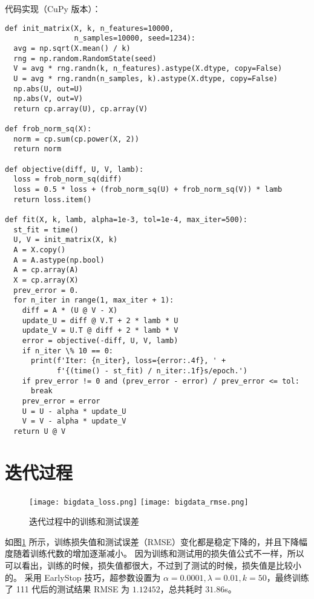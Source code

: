 \documentclass[degree=project,degree-type=project]{thuthesis}
\begin{document}
代码实现（CuPy 版本）：

  \begin{verbatim}
def init_matrix(X, k, n_features=10000,
                n_samples=10000, seed=1234):
  avg = np.sqrt(X.mean() / k)
  rng = np.random.RandomState(seed)
  V = avg * rng.randn(k, n_features).astype(X.dtype, copy=False)
  U = avg * rng.randn(n_samples, k).astype(X.dtype, copy=False)
  np.abs(U, out=U)
  np.abs(V, out=V)
  return cp.array(U), cp.array(V)

def frob_norm_sq(X):
  norm = cp.sum(cp.power(X, 2))
  return norm

def objective(diff, U, V, lamb):
  loss = frob_norm_sq(diff)
  loss = 0.5 * loss + (frob_norm_sq(U) + frob_norm_sq(V)) * lamb
  return loss.item()

def fit(X, k, lamb, alpha=1e-3, tol=1e-4, max_iter=500):
  st_fit = time()
  U, V = init_matrix(X, k)
  A = X.copy()
  A = A.astype(np.bool)
  A = cp.array(A)
  X = cp.array(X)
  prev_error = 0.
  for n_iter in range(1, max_iter + 1):
    diff = A * (U @ V - X)
    update_U = diff @ V.T + 2 * lamb * U
    update_V = U.T @ diff + 2 * lamb * V
    error = objective(-diff, U, V, lamb)
    if n_iter \% 10 == 0:
      print(f'Iter: {n_iter}, loss={error:.4f}, ' +
            f'{(time() - st_fit) / n_iter:.1f}s/epoch.')
    if prev_error != 0 and (prev_error - error) / prev_error <= tol:
      break
    prev_error = error
    U = U - alpha * update_U
    V = V - alpha * update_V
  return U @ V
  \end{verbatim}

\section{迭代过程}

\begin{figure}[h]
\centering%
{\texttt{[image: bigdata\_loss.png]}}%
\hspace{4em}%
{\texttt{[image: bigdata\_rmse.png]}}
  \caption{迭代过程中的训练和测试误差}
  \label{fig:training}
\end{figure}

如图\ref{fig:training} 所示，训练损失值和测试误差（RMSE）变化都是稳定下降的，并且下降幅度随着训练代数的增加逐渐减小。
因为训练和测试用的损失值公式不一样，所以可以看出，训练的时候，损失值都很大，不过到了测试的时候，损失值是比较小的。
采用 EarlyStop 技巧，超参数设置为 $\alpha=0.0001, \lambda = 0.01, k=50$，最终训练了 111 代后的测试结果 RMSE 为 $1.12452$，总共耗时 $31.86$s。
\end{document}
